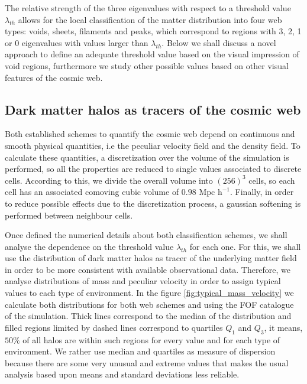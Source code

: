\documentclass[a4,useAMS,usenatbib,usegraphicx]{latex/mn2e}
\begin{document}
The relative strength of the three eigenvalues with respect to a threshold
value $\lambda_{th}$ allows for the local classification of the matter 
distribution into four web types: voids, sheets, filaments and peaks, 
which correspond to regions with 3, 2, 1 or 0 eigenvalues with values 
larger than $\lambda_{th}$. Below we shall discuss a novel approach to 
define an adequate threshold value based on the visual impression of void
regions, furthermore we study other possible values based on other visual
features of the cosmic web.



\subsection{Dark matter halos as tracers of the cosmic web 
}
\label{subsec:halos_cosmicweb}


Both established schemes to quantify the cosmic web depend on continuous 
and smooth physical quantities, i.e the peculiar velocity field and the 
density field. To calculate these quantities, a discretization over the 
volume of the simulation is performed, so all the properties are reduced 
to single values associated to discrete cells. According to this, we 
divide the overall volume into $(256)^3$ cells, so each cell has an 
associated comoving cubic volume of $0.98 \mbox{ Mpc h}^{-1}$. Finally, in 
order to reduce possible effects due to the discretization process, a 
gaussian softening is performed between neighbour cells.



Once defined the numerical details about both classification schemes, we
shall analyse the dependence on the threshold value $\lambda_{th}$ for 
each one. For this, we shall use the distribution of dark matter halos as 
tracer of the underlying matter field in order to be more consistent with
available observational data. Therefore, we analyse distributions of mass 
and peculiar velocity in order to assign typical values to each type of 
environment. In the figure \ref{fig:typical_mass_velocity} we calculate 
both distributions for both web schemes and using the FOF catalogue of the 
simulation. Thick lines correspond to the median of the distribution and 
filled regions limited by dashed lines correspond to quartiles $Q_1$ and 
$Q_3$, it means, $50\%$ of all halos are within such regions for every 
\lth value and for each type of environment. We rather use median and 
quartiles as measure of dispersion because there are some very unusual 
and extreme values that makes the usual analysis based upon means and 
standard deviations less reliable.
\end{document}
